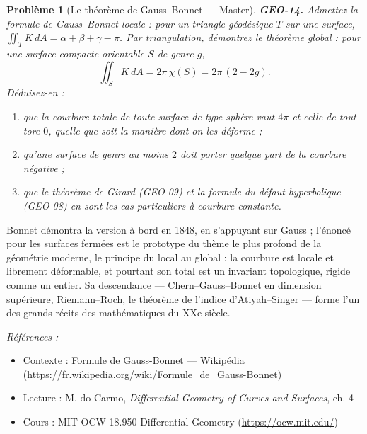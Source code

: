 \documentclass[11pt]{article}
\newtheorem{problem}{Problème}
\newenvironment{refs}{\par\small\noindent\emph{Références :}\begin{itemize}\setlength\itemsep{0pt}}{\end{itemize}\normalsize}
\begin{document}
\begin{problem}[{Le théorème de Gauss--Bonnet --- Master}]
\textbf{GEO-14.} Admettez la formule de Gauss--Bonnet locale : pour un triangle géodésique
$ T $ sur une surface, $ \iint_T K \, dA = \alpha + \beta + \gamma - \pi $. Par
triangulation, démontrez le théorème global : pour une surface compacte orientable $ S $ de
genre $ g $,
\[ \iint_S K \, dA = 2\pi\,\chi(S) = 2\pi\,(2 - 2g). \]
Déduisez-en :
\begin{enumerate}
\item[(a)] que la courbure totale de toute surface de type sphère vaut $ 4\pi $ et celle de tout tore
$ 0 $, quelle que soit la manière dont on les déforme ;
\item[(b)] qu'une surface de genre au moins $ 2 $ doit porter quelque part de la courbure
négative ;
\item[(c)] que le théorème de Girard (GEO-09) et la formule du défaut hyperbolique (GEO-08) en sont les
cas particuliers à courbure constante.
\end{enumerate}

\end{problem}

\noindent Bonnet démontra la version à bord en 1848, en s'appuyant sur Gauss ; l'énoncé
pour les surfaces fermées est le prototype du thème le plus profond de la géométrie moderne, le
principe du local au global : la courbure est locale et librement déformable, et pourtant son total
est un invariant topologique, rigide comme un entier. Sa descendance --- Chern--Gauss--Bonnet en
dimension supérieure, Riemann--Roch, le théorème de l'indice d'Atiyah--Singer --- forme l'un des grands
récits des mathématiques du XXe siècle.

\begin{refs}
\item Contexte : Formule de Gauss-Bonnet --- Wikipédia (\url{https://fr.wikipedia.org/wiki/Formule_de_Gauss-Bonnet})
\item Lecture : M. do Carmo, \textit{Differential Geometry of Curves and Surfaces}, ch. 4
\item Cours : MIT OCW 18.950 Differential Geometry (\url{https://ocw.mit.edu/})
\end{refs}

\bigskip
\end{document}
